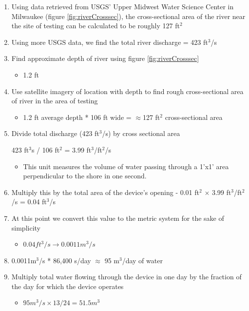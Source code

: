 \documentclass[fleqn,10pt]{SelfArx} %
\begin{document}
	\begin{enumerate}
		\item Using data retrieved from USGS’ Upper Midwest Water Science Center in Milwaukee (figure \ref{fig:riverCrosssec}), the cross-sectional area of the river near the site of testing can be calculated to be roughly 127 ft$^2$
		\item Using more USGS data, we find the total river discharge = 423 ft$^3$/s 
		\item Find approximate depth of river using figure \ref{fig:riverCrosssec} 
		
		\begin{itemize}
			\item 1.2 ft 
		\end{itemize}
		
		\item Use satellite imagery of location with depth to find rough cross-sectional area of river in the area of testing 
		\begin{itemize}
			\item 1.2 ft average depth * 106 ft wide =  $\approx$127 ft$^2$ cross-sectional area
		\end{itemize}
		\item Divide total discharge (423 ft$^3$/s) by cross sectional area 
		
		 423 ft$^3$s / 106 ft$^2$ = 3.99 ft$^3$/ft$^2$/s
		
		\begin{itemize}
			\item This unit measures the volume of water passing through a 1’x1’ area perpendicular to the shore in one second. 
		\end{itemize}
		\item Multiply this by the total area of the device’s opening - 0.01 ft$^2$ $\times$ 3.99 ft$^3$/ft$^2$/s = 0.04 ft$^3$/s
		\item At this point we convert this value to the metric system for the sake of simplicity 
		
		\begin{itemize}
			\item $0.04 ft^3/s \rightarrow 0.0011 m^3/s$
		\end{itemize}
		
		\item 0.0011m$^3$/s * 86,400 s/day $\approx$ 95 m$^3$/day of water
		
		\item Multiply total water flowing through the device in one day by the fraction of the day for which the device operates
		
		\begin{itemize}
			\item $95m^3/s \times 13/24 = 51.5m^3$
		\end{itemize}
		
	\end{enumerate}
\end{document}
